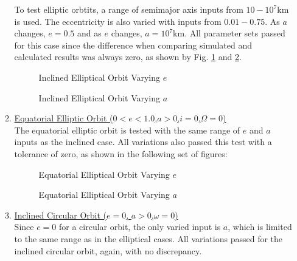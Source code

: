 \begin{itemize}
\begin{enumerate}
		To test elliptic orbtits, a range of semimajor axis inputs from $10-10^7$km is used. The eccentricity is also varied with inputs from $0.01-0.75$. As $a$ changes, $e=0.5$ and as $e$ changes, $a=10^7$km. All parameter sets passed for this case since the difference when comparing simulated and calculated results was always zero, as shown by Fig. \ref{fig:2} and \ref{fig:3}.
		\begin{figure}[H] 
	\centering
	\caption{Inclined Elliptical Orbit Varying $e$}\label{fig:2}
\end{figure}
\begin{figure}[H]
	\centering
	\caption{Inclined Elliptical Orbit Varying $a$}\label{fig:3}
\end{figure}
\pagebreak
		\item \underline{Equatorial Elliptic Orbit ($0<e<1.0$,\quad $a>0$,\quad $i=0$,\quad $\Omega=0$)}\\
		The equatorial elliptic orbit is tested with the same range of $e$ and $a$ inputs as the inclined case. All variations also passed this test with a tolerance of zero, as shown in the following set of figures:
		\begin{figure}[H] \label{fig:4}
	\centering
	\caption{Equatorial Elliptical Orbit Varying $e$}
\end{figure}
\begin{figure}[H] \label{fig:5}
	\centering
	\caption{Equatorial Elliptical Orbit Varying $a$}
\end{figure}
		\pagebreak
		\item \underline{Inclined Circular Orbit ($e=0$, \quad $a>0$,\quad $\omega=0$)}\\
		Since $e=0$ for a circular orbit, the only varied input is $a$, which is limited to the same range as in the elliptical cases. All variations passed for the inclined circular orbit, again, with no discrepancy.
		\begin{figure}[H] \label{fig:6}

\end{figure}
\end{enumerate}
\end{itemize}
